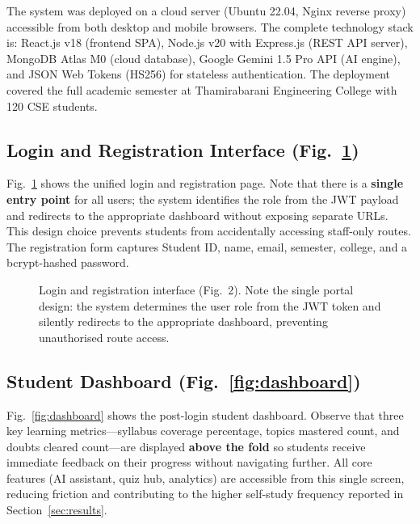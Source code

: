 \documentclass[conference]{IEEEtran}
\begin{document}
The system was deployed on a cloud server (Ubuntu 22.04, Nginx reverse proxy) accessible from both desktop and mobile browsers. The complete technology stack is: React.js v18 (frontend SPA), Node.js v20 with Express.js (REST API server), MongoDB Atlas M0 (cloud database), Google Gemini 1.5 Pro API (AI engine), and JSON Web Tokens (HS256) for stateless authentication. The deployment covered the full academic semester at Thamirabarani Engineering College with 120 CSE students.

\subsection{Login and Registration Interface (Fig.~\ref{fig:login})}

Fig.~\ref{fig:login} shows the unified login and registration page. Note that there is a \textbf{single entry point} for all users; the system identifies the role from the JWT payload and redirects to the appropriate dashboard without exposing separate URLs. This design choice prevents students from accidentally accessing staff-only routes. The registration form captures Student ID, name, email, semester, college, and a bcrypt-hashed password.

\begin{figure}[h]
\centering
{}
\caption{Login and registration interface (Fig.~2). Note the single portal design: the system determines the user role from the JWT token and silently redirects to the appropriate dashboard, preventing unauthorised route access.}
\label{fig:login}
\end{figure}

\subsection{Student Dashboard (Fig.~\ref{fig:dashboard})}

Fig.~\ref{fig:dashboard} shows the post-login student dashboard. Observe that three key learning metrics—syllabus coverage percentage, topics mastered count, and doubts cleared count—are displayed \textbf{above the fold} so students receive immediate feedback on their progress without navigating further. All core features (AI assistant, quiz hub, analytics) are accessible from this single screen, reducing friction and contributing to the higher self-study frequency reported in Section~\ref{sec:results}.
\end{document}
